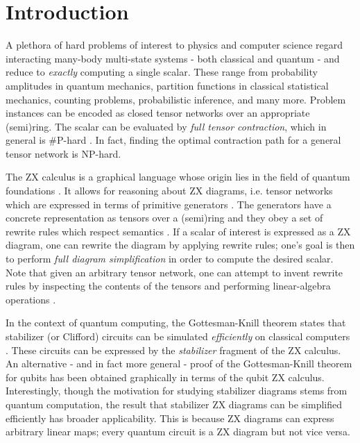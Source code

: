 \section{Introduction}


A plethora of hard problems of interest to physics and computer science
regard interacting many-body multi-state systems - both classical and quantum -
and reduce to \emph{exactly} computing a single scalar.
These range from probability amplitudes in quantum mechanics,
partition functions in classical statistical mechanics,
counting problems, probabilistic inference, and many more.
Problem instances can be encoded as closed
tensor networks over an appropriate (semi)ring.
The scalar can be evaluated by \emph{full tensor contraction},
which in general is \#P-hard \cite{Damm2002}.
In fact, finding the optimal contraction path for a general tensor network is NP-hard.

The ZX calculus is a graphical language whose origin lies in the field of quantum foundations \cite{Coecke2011}.
It allows for reasoning about ZX diagrams, i.e. tensor networks which are expressed in terms of primitive generators \cite{vandewetering2020zxcalculus}.
The generators have a concrete representation as tensors over
a (semi)ring and they obey a set of rewrite rules which respect semantics \cite{wang2020completeness}.
If a scalar of interest is expressed as a ZX diagram,
one can rewrite the diagram by applying rewrite rules; one's goal is then to perform \emph{full diagram simplification} in order to compute the desired scalar.
Note that
given an arbitrary tensor network, one can attempt to invent rewrite rules by inspecting the contents of the tensors and performing linear-algebra operations \cite{gray2020hyperoptimized}.

In the context of quantum computing,
the Gottesman-Knill theorem states that stabilizer (or Clifford) circuits can be
simulated \emph{efficiently} on classical computers \cite{Aaronson2004}.
These circuits can be expressed by the \emph{stabilizer} fragment of the ZX calculus.
An alternative - and in fact more general - proof of the Gottesman-Knill theorem for qubits has been obtained graphically in terms of the qubit ZX calculus.
Interestingly, though the motivation for studying stabilizer diagrams stems from quantum computation, the result that stabilizer ZX diagrams can be simplified efficiently has broader applicability. This is because
ZX diagrams can express arbitrary linear maps;
every quantum circuit is a ZX diagram but not vice versa.

